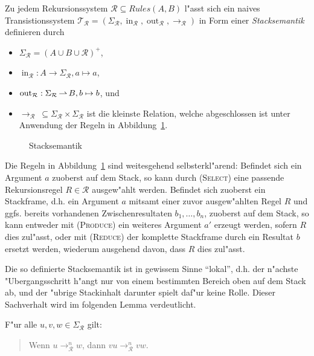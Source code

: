 \documentclass[12pt,a4paper,final]{article}
\begin{document}
Zu jedem Rekursionssystem \mbox{$\mathcal{R} \subseteq \mathit{Rules}(A,B)$} l"asst sich ein naives Transistionssystem
\mbox{$\mathcal{T}_{\mathcal{R}} = (\Sigma_{\mathcal{R}},\operatorname{in}_{\mathcal{R}},\operatorname{out}_{\mathcal{R}},\rightarrow_{\mathcal{R}} )$}
in Form einer \emph{Stacksemantik} definieren durch
\begin{itemize}
\item $\Sigma_{\mathcal{R}} = (A \cup B \cup \mathcal{R})^+$,
\item $\operatorname{in}_{\mathcal{R}}: A \to \Sigma_{\mathcal{R}}, a \mapsto a$,
\item $\operatorname{out}_{\mathcal{R}}: \Sigma_{\mathcal{R}} \operatorname{\rightharpoonup} B, b \mapsto b$, und
\item $\rightarrow_{\mathcal{R}}\ \subseteq \Sigma_{\mathcal{R}} \times \Sigma_{\mathcal{R}}$ ist die kleinste
  Relation, welche abgeschlossen ist unter Anwendung der Regeln in Abbildung~\ref{fig:Stacksemantik}.
\end{itemize}
\begin{figure}[htb]
  \centering
  \caption{Stacksemantik}
  \label{fig:Stacksemantik}
\end{figure}
Die Regeln in Abbildung~\ref{fig:Stacksemantik} sind weitesgehend selbsterkl"arend: Befindet
sich ein Argument $a$ zuoberst auf dem Stack, so kann durch \textsc{(Select)} eine
passende Rekursionsregel \mbox{$R \in \mathcal{R}$} ausgew"ahlt werden. Befindet sich zuoberst
ein Stackframe, d.h. ein Argument $a$ mitsamt einer zuvor ausgew"ahlten Regel $R$ und ggfs.\xspace
bereits vorhandenen Zwischenresultaten \mbox{$b_1,\ldots,b_n$}, zuoberst auf dem Stack, so
kann entweder mit \textsc{(Produce)} ein weiteres Argument $a'$ erzeugt werden, sofern $R$ dies
zul"asst, oder mit \textsc{(Reduce)} der komplette Stackframe durch ein Resultat $b$ ersetzt
werden, wiederum ausgehend davon, dass $R$ dies zul"asst.

Die so definierte Stacksemantik ist in gewissem Sinne ``lokal'', d.h. der n"achste "Ubergangsschritt
h"angt nur von einem bestimmten Bereich oben auf dem Stack ab, und der "ubrige Stackinhalt darunter
spielt daf"ur keine Rolle. Dieser Sachverhalt wird im folgenden Lemma verdeutlicht.
\begin{lemma}[Lokalit"at]
  F"ur alle \mbox{$u,v,w \in \Sigma_{\mathcal{R}}$} gilt:
  \begin{quote}
    Wenn \mbox{$u \rightarrow_{\mathcal{R}}^n w$}, dann \mbox{$vu \rightarrow_{\mathcal{R}}^n vw$}.
  \end{quote}
\end{lemma}
\end{document}
